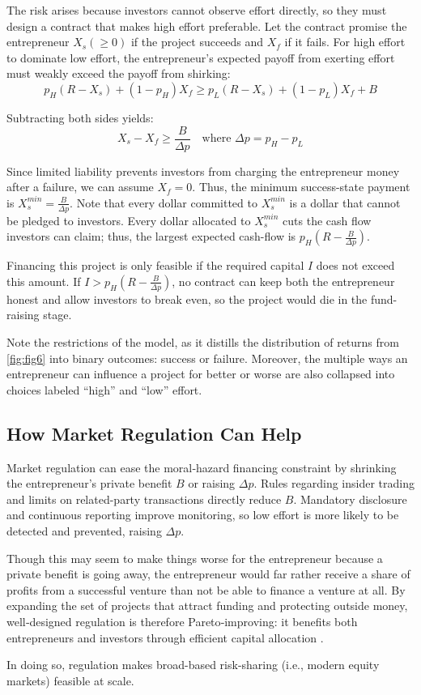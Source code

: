 The risk arises because investors cannot observe effort directly, so they must design a contract that makes high effort preferable. Let the contract promise the entrepreneur $X_s (\ge 0)$ if the project succeeds and $X_f$ if it fails. For high effort to dominate low effort, the entrepreneur's expected payoff from exerting effort must weakly exceed the payoff from shirking:
\[
p_H (R - X_s) + (1 - p_H) X_f \geq p_L (R - X_s) + (1 - p_L) X_f + B
\]

Subtracting both sides yields:
\[
X_s - X_f \geq \frac{B}{\Delta p}
\quad \text{where } \Delta p = p_H - p_L
\]


Since limited liability prevents investors from charging the entrepreneur money after a failure, we can assume $X_f = 0$. Thus, the minimum success-state payment is $X_s^{min} = \frac{B}{\Delta p}$. Note that every dollar committed to $X_s^{min}$ is a dollar that cannot be pledged to investors. Every dollar allocated to $X_s^{min}$ cuts the cash flow investors can claim; thus, the largest expected cash-flow is $p_H(R- \frac{B}{\Delta p})$.

Financing this project is only feasible if the required capital $I$ does not exceed this amount. If $I> p_H(R- \frac{B}{\Delta p})$, no contract can keep both the entrepreneur honest and allow investors to break even, so the project would die in the fund-raising stage.

Note the restrictions of the model, as it distills the distribution of returns from \autoref{fig:fig6} into binary outcomes: success or failure. Moreover, the multiple ways an entrepreneur can influence a project for better or worse are also collapsed into choices labeled “high” and “low” effort.


\subsection{How Market Regulation Can Help}
Market regulation can ease the moral‑hazard financing constraint by shrinking the entrepreneur’s private benefit $B$ or raising $\Delta p$. Rules regarding insider trading and limits on related-party transactions directly reduce $B$. Mandatory disclosure and continuous reporting improve monitoring, so low effort is more likely to be detected and prevented, raising $\Delta p$. 

Though this may seem to make things worse for the entrepreneur because a private benefit is going away, the entrepreneur would far rather receive a share of profits from a successful venture than not be able to finance a venture at all. By expanding the set of projects that attract funding and protecting outside money, well‑designed regulation is therefore Pareto‑improving: it benefits both entrepreneurs and investors through efficient capital allocation \citep{holmstrom2011inside}.

In doing so, regulation makes broad-based risk-sharing (i.e., modern equity markets) feasible at scale.